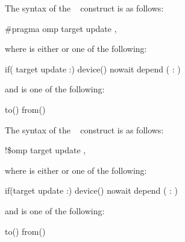 \syntax
\begin{ccppspecific}
The syntax of the ~ construct is as follows:

\begin{boxedcode}
\#pragma omp target update \plc{clause[ [ [},\plc{] clause] ... ] new-line}
\end{boxedcode}
where  is either  or one of the following:

\begin{indentedcodelist}
if(\plc{[} target update :\plc{] scalar-expression})
device()
nowait
depend ( : )
\end{indentedcodelist}

and  is one of the following:

\begin{indentedcodelist}
to()
from()
\end{indentedcodelist}
\end{ccppspecific}

\begin{fortranspecific}
The syntax of the ~ construct is as follows:

\begin{boxedcode}
!\$omp target update \plc{clause[ [ [},\plc{] clause] ... ]}
\end{boxedcode}

where  is either  or one of the following:

\begin{indentedcodelist}
if(\plc{[}target update :\plc{] scalar-logical-expression})
device()
nowait
depend ( : )
\end{indentedcodelist}

and  is one of the following:

\begin{indentedcodelist}
to()
from()
\end{indentedcodelist}
\end{fortranspecific}

